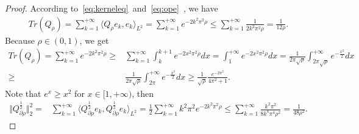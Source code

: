 \documentclass[11pt]{article}
\numberwithin{equation}{section}%
\numberwithin{figure}{section}%
\theoremstyle{remark}
\begin{document}
		\begin{proof}
			According to~\eqref{eq:kerneleq}~and~\eqref{eq:ope}~, we have
			\begin{align*}
		 Tr(Q_{\rho})=\sum_{k=1}^{+\infty}\langle Q_{\rho}e_{k},e_{k}\rangle_{L^{2}}=\sum_{k=1}^{+\infty} e^{-2k^{2}\pi^{2}\rho}\leq\sum_{k=1}^{+\infty}\frac{1}{2k^{2}\pi^{2}\rho}=\frac{1}{12\rho}.
			\end{align*}
		Because $\rho\in(0,1)$, we get
			\begin{align*}
			 Tr(Q_{\rho})=\sum_{k=1}^{+\infty} e^{-2k^{2}\pi^{2}\rho}\geq&\sum_{k=1}^{+\infty}\int_{k}^{k+1}e^{-2x^{2}\pi^{2}\rho}dx=\int_{1}^{+\infty}e^{-2x^{2}\pi^{2}\rho}dx=\frac{1}{2\pi\sqrt{\rho}}\int_{2\pi\sqrt{\rho}}^{+\infty}e^{-\frac{x^{2}}{2}}dx\\
			 \geq&\frac{1}{2\pi\sqrt{\rho}}\int_{2\pi}^{+\infty}e^{-\frac{x^{2}}{2}}dx\geq \frac{1}{\sqrt{\rho}}\frac{e^{-2\pi^{2}}}{4\pi^{2}+1}.
			\end{align*}
			Note that $e^{x}\geq x^{2}$ for $x\in[1,+\infty)$, then
			\begin{align*}
				\Vert Q_{\partial\rho}^{\frac{1}{2}}\Vert^{2}_{2}=&\sum_{k=1}^{+\infty}\langle Q_{\partial\rho}^{\frac{1}{2}}e_{k},Q_{\partial\rho}^{\frac{1}{2}}e_{k}\rangle_{L^{2}}
				=\frac{1}{2}\sum_{k=1}^{+\infty}k^{2}\pi^{2} e^{-2k^{2}\pi^{2}\rho}\leq\sum_{k=1}^{+\infty}\frac{k^{2}\pi^{2}}{8k^{4}\pi^{4}\rho^{2}}=\frac{1}{48\rho^{2}}.
			\end{align*}
		\end{proof}
	
\end{document}
